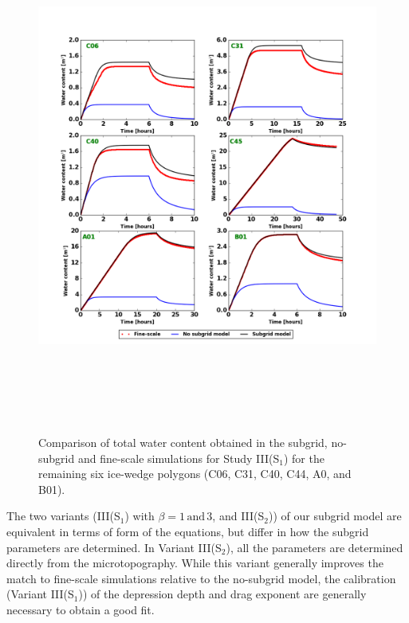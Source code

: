 \documentclass[review,11pt]{elsarticle}
\begin{document}
%
\begin{figure}
\centering
\includegraphics[width=13.2cm, height=17cm]{./figures/new-model/all-polygons-watercontent.png}
\caption{Comparison of total water content obtained in the subgrid, no-subgrid and fine-scale simulations for Study III(S$_1$) for the remaining six ice-wedge polygons (C06, C31, C40, C44, A0, and B01).}
\label{all-polygons-watercontent}
\end{figure}
%

The two variants (III(S$_1$) with $\beta =1 \, \text{and} \, 3$, and III(S$_2$)) of our subgrid model are equivalent in terms of form of the equations, but differ in how the subgrid parameters are determined. In Variant III(S$_2$), all the parameters are determined directly from the microtopography. While this variant generally improves the match to fine-scale simulations relative to the no-subgrid model, the calibration (Variant III(S$_1$)) of the depression depth and drag exponent are generally necessary to obtain a good fit. 

%
\FloatBarrier
\end{document}
